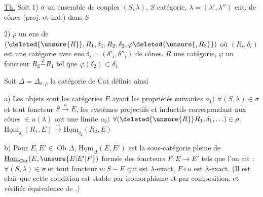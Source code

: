 \uline{Th.} Soit 1) $\sigma$ un ensemble de couples $(S,\lambda)$, $S$ catégorie, $\lambda=(\lambda',\lambda'')$ ens. de cônes (proj. et ind.) dans $S$

2) $\rho$ un ens de   $(\deleted{\unsure{R}},R_1,\delta_1,R_2,\delta_2,\varphi\deleted{\unsure{,R_3}})$ où $(R_i,\delta_i)$  est une catégorie avec ens $\delta_i=(\delta'_i,\delta''_i)$ de cônes. $R$ une catégorie,  $\varphi$ un foncteur $R_2\mathrel{\overset{\varphi}{-}}R_1$ tel
que $\varphi(\delta_2)\subset\delta_1$ 

Soit $\Delta=\Delta_{\sigma,\rho}$ la catégorie de Cat définie ainsi

a) Les objets sont les catégories $E$ ayant les propriétés suivantes
$a_1)$ $\forall(S,\lambda)\in\sigma$ et tout foncteur $S\xrightarrow{u}E$, les systèmes projectifs et inductifs correspondant aux cônes $\in u(\lambda)$ ont une limite
$a_2)$ $\forall(\deleted{\unsure{R}}R_1,\delta_1,\ldots)\in\rho$,  
$\underline{\mathrm{Hom}}_{\delta_1}(R_1,E)\xrightarrow{\sim}\underline{\mathrm{Hom}}_{\delta_2}(R_2,E)$

b) Pour $E,E'\in\operatorname{Ob}\Delta$, $\underline{\mathrm{Hom}}_\Delta(E,E')$ est la sous-catégorie  pleine de $\underline{\mathrm{Hom}}_{\mathrm{Cat}}(E,\unsure{E|E'|F})$ formée des foncteurs $F:E\to E'$ tels que l'on ait : $\forall(S,\lambda)\in\sigma$ et tout foncteur $u:S-E$ qui est $\lambda$-exact, $F\circ u$ est $\lambda$-exact. (Il est clair que cette condition est stable par isomorphisme et par composition, et vérifiée   équivalence de .)

